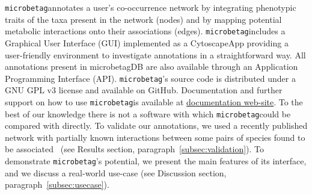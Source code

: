 \documentclass[sn-mathphys,Numbered]{sn-jnl}  %
\theoremstyle{thmstyleone}%
\theoremstyle{thmstyletwo}%
\theoremstyle{thmstylethree}%
\newcommand{\microbetag}{\texttt{microbetag}}
\begin{document}
    \microbetag annotates a user's co-occurrence network by integrating phenotypic traits of the taxa present in the network (nodes) and by mapping potential metabolic interactions onto their associations (edges).
    \microbetag includes a Graphical User Interface (GUI) implemented as a CytoscapeApp providing a user-friendly environment to investigate annotations in a straightforward way.
    All annotations present in microbetagDB are also available through an Application Programming Interface (API).
    \microbetag's source code is distributed under a GNU GPL v3 license and available on GitHub. 
    Documentation and further support on how to use \microbetag is available at \href{https://hariszaf.github.io/microbetag/}{documentation web-site}.
    To the best of our knowledge there is not a software with which \microbetag could be compared with directly. 
    To validate our annotations, we used a recently published network with partially known interactions between some pairs of species found to be associated~\cite{hessler2023vitamin} (see Results section, paragraph~\ref{subsec:validation}).
    To demonstrate \microbetag's potential, we present the main features of its interface, and we discuss a real-world use-case (see Discussion section, paragraph~\ref{subsec:usecase}).




\end{document}
